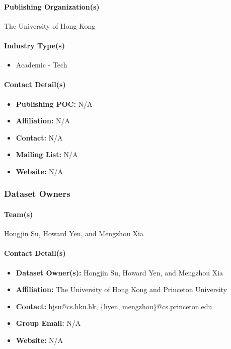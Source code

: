 \paragraph{Publishing Organization(s)}
The University of Hong Kong

\paragraph{Industry Type(s)}
\begin{itemize}
    \item Academic - Tech
\end{itemize}

\paragraph{Contact Detail(s)}
\begin{itemize}
    \item \textbf{Publishing POC:} N/A
    \item \textbf{Affiliation:} N/A
    \item \textbf{Contact:} N/A
    \item \textbf{Mailing List:} N/A
    \item \textbf{Website:} N/A
\end{itemize}

\subsubsection{Dataset Owners}

\paragraph{Team(s)}
Hongjin Su, Howard Yen, and Mengzhou Xia

\paragraph{Contact Detail(s)}
\begin{itemize}
    \item \textbf{Dataset Owner(s):} Hongjin Su, Howard Yen, and Mengzhou Xia
    \item \textbf{Affiliation:} The University of Hong Kong and Princeton University
    \item \textbf{Contact:} hjsu@cs.hku.hk, \{hyen, mengzhou\}@cs.princeton.edu
    \item \textbf{Group Email:} N/A
    \item \textbf{Website:} N/A
\end{itemize}

